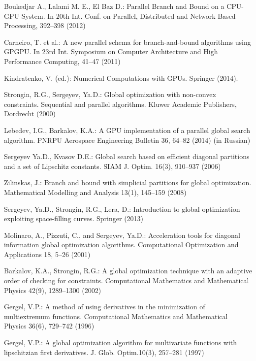 \documentclass[smallcondensed]{svjour3}     %
\begin{document}
\begin{thebibliography}{}
Boukedjar A., Lalami M. E., El Baz D.: Parallel Branch and Bound on a CPU-GPU System. In 20th Int. Conf. on Parallel,  Distributed and Network-Based Processing, 392--398 (2012)

Carneiro, T. et al.: A new parallel schema for branch-and-bound algorithms using GPGPU. In 23rd Int. Symposium on Computer Architecture and High Performance Computing, 41--47 (2011)

Kindratenko, V. (ed.): Numerical Computations with GPUs. Springer (2014).

Strongin, R.G., Sergeyev, Ya.D.: Global optimization with non-convex constraints. Sequential and parallel algorithms. Kluwer Academic Publishers, Dordrecht (2000)

Lebedev, I.G., Barkalov, K.A.: A GPU implementation of a parallel global search algorithm. PNRPU Aerospace Engineering Bulletin 36, 64--82 (2014) (in Russian)

Sergeyev Ya.D., Kvasov D.E.: Global search based on efficient diagonal partitions and a set of Lipschitz constants. SIAM J. Optim. 16(3), 910--937 (2006)

Zilinskas, J.: Branch and bound with simplicial partitions for global optimization. Mathematical Modelling and Analysis 13(1), 145--159 (2008)

Sergeyev, Ya.D., Strongin, R.G., Lera, D.: Introduction to global optimization exploiting space-filling curves. Springer (2013)

Molinaro, A., Pizzuti, C., and Sergeyev, Ya.D.: Acceleration tools for diagonal information global optimization algorithms. Computational Optimization and Applications 18, 5--26 (2001)

Barkalov, K.A., Strongin, R.G.: A global optimization technique with an adaptive order of checking for constraints. Computational Mathematics and Mathematical Physics 42(9), 1289--1300 (2002)

Gergel, V.P.: A method of using derivatives in the minimization of multiextremum functions. Computational Mathematics and Mathematical Physics 36(6), 729--742 (1996)

Gergel, V.P.: A global optimization algorithm for multivariate functions with lipschitzian first derivatives. J. Glob. Optim.10(3), 257--281 (1997)


\end{thebibliography}
\end{document}
